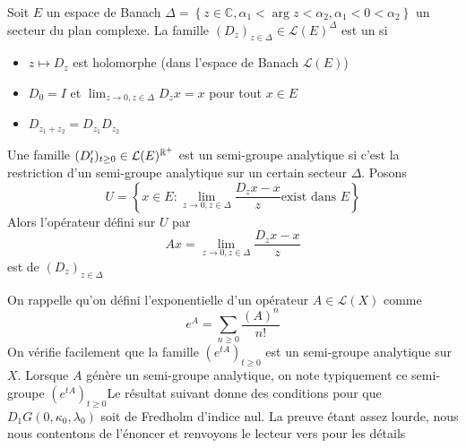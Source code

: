 \documentclass[memoire.tex]{subfiles}
\begin{document}
    \begin{definition}
        Soit $E$ un espace de Banach $\Delta=\left\{z\in\mathbb{C}, 
        \alpha_1<\arg z<\alpha_2, \alpha_1<0<\alpha_2\right\}$ un secteur 
        du plan complexe. La famille $(D_z)_{z\in\Delta}\in\mathcal{L}(E)^
        {\Delta}$ est un  si
        \begin{itemize}
            \item $z\mapsto D_z$ est holomorphe (dans l'espace de Banach $\mathcal{L}(E)$)
            \item $D_0=I$ et $\lim_{z\to 0,z\in\Delta}D_{z}x=x$ pour tout $x\in E$
            \item $D_{z_1+z_2}=D_{z_1}D_{z_2}$
        \end{itemize}
        Une famille $(D'_t)_{t\geq 0}\in\mathcal{L}(E)^{\mathbb{R}^+}$ est un semi-groupe analytique si c'est la restriction d'un semi-groupe analytique sur un certain secteur $\Delta$. Posons
        \begin{equation*}
            U=\left\{ x\in E:\lim_{z\to 0,z\in\Delta}\frac{D_zx-x}{z}\text{exist dans } E\right\}
        \end{equation*}
        Alors l'opérateur défini sur $U$ par
        \begin{equation*}
            Ax=\lim_{z\to 0,z\in\Delta}\frac{D_zx-x}{z}
        \end{equation*}
        est de $(D_z)_{z\in\Delta}$
    \end{definition}
    On rappelle qu'on défini l'exponentielle d'un opérateur $A\in\mathcal{L}(X)$ comme
    \begin{equation*}
        e^{A}=\sum_{n\geq 0}\frac{(A)^n}{n!}
    \end{equation*}
    On vérifie facilement que la famille $(e^{tA})_{t\geq 0}$ est un semi-groupe analytique sur $X$. Lorsque $A$ génère un semi-groupe analytique, on note typiquement ce semi-groupe $(e^{tA})_{t\geq 0}$Le résultat suivant donne des conditions pour que $D_1 G(0,\kappa_0,\lambda_0)$ soit de Fredholm d'indice nul. La preuve étant assez lourde, nous nous contentons de l'énoncer et renvoyons le lecteur vers \cite{kielhoefer2012bta} pour les détails
\end{document}
